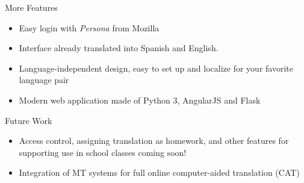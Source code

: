 \documentclass[final]{beamer}
\begin{document}
\begin{frame}{}
\begin{columns}[t]
\begin{column}{.32\linewidth}
  \begin{block}{\large More Features}
    \begin{itemize}
    \item Easy login with \emph{Persona} from Mozilla
    \item Interface already translated into Spanish and English.
    \item Language-independent design, easy to set up and localize for your
    favorite language pair
    \item Modern web application made of Python 3, AngularJS and Flask
    \end{itemize}
  \end{block}

  \begin{block}{\large Future Work}
    \begin{itemize}
    \item Access control, assigning translation as homework, and other features
    for supporting use in school classes coming soon!
    \item Integration of MT systems for full online computer-aided translation
    (CAT)
    \end{itemize}
  \end{block}

  \end{column}
\end{columns}
\end{frame}
\end{document}
